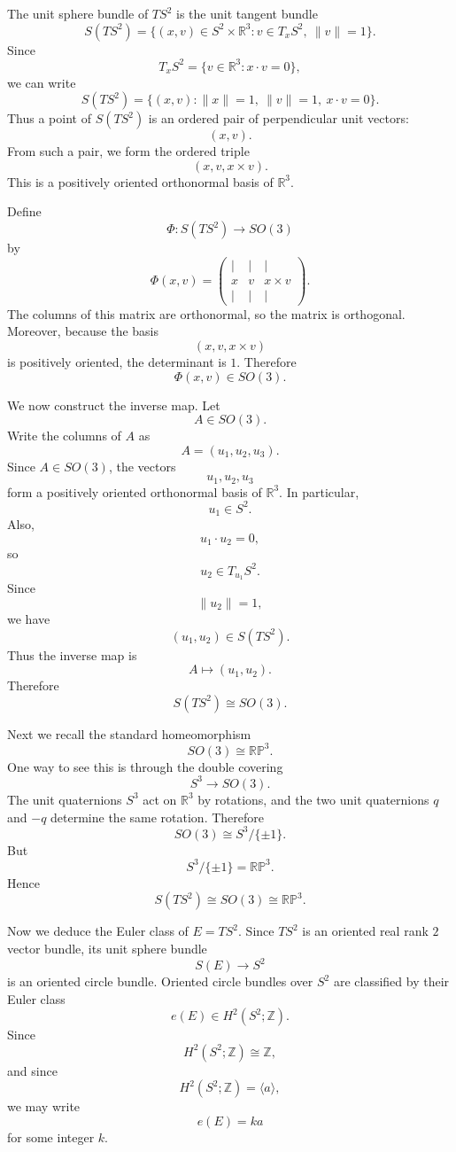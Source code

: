 \begin{solution}
The unit sphere bundle of \(TS^{2}\) is the unit tangent bundle
	\[
	S(TS^{2})
	=
	\{(x,v)\in S^{2}\times \mathbb R^{3}:v\in T_{x}S^{2},\ \|v\|=1\}.
	\]
	Since
	\[
	T_{x}S^{2}
	=
	\{v\in \mathbb R^{3}:x\cdot v=0\},
	\]
	we can write
	\[
	S(TS^{2})
	=
	\{(x,v):\|x\|=1,\ \|v\|=1,\ x\cdot v=0\}.
	\]
	Thus a point of \(S(TS^{2})\) is an ordered pair of perpendicular unit vectors:
	\[
	(x,v).
	\]
	From such a pair, we form the ordered triple
	\[
	(x,v,x\times v).
	\]
	This is a positively oriented orthonormal basis of \(\mathbb R^{3}\).

	Define
	\[
	\Phi:S(TS^{2})\to SO(3)
	\]
	by
	\[
	\Phi(x,v)
	=
	\begin{pmatrix}
		|&|&|\\
		x&v&x\times v\\
		|&|&|
	\end{pmatrix}.
	\]
	The columns of this matrix are orthonormal, so the matrix is orthogonal. Moreover, because the basis
	\[
	(x,v,x\times v)
	\]
	is positively oriented, the determinant is \(1\). Therefore
	\[
	\Phi(x,v)\in SO(3).
	\]

	We now construct the inverse map. Let
	\[
	A\in SO(3).
	\]
	Write the columns of \(A\) as
	\[
	A=(u_{1},u_{2},u_{3}).
	\]
	Since \(A\in SO(3)\), the vectors
	\[
	u_{1},u_{2},u_{3}
	\]
	form a positively oriented orthonormal basis of \(\mathbb R^{3}\). In particular,
	\[
	u_{1}\in S^{2}.
	\]
	Also,
	\[
	u_{1}\cdot u_{2}=0,
	\]
	so
	\[
	u_{2}\in T_{u_{1}}S^{2}.
	\]
	Since
	\[
	\|u_{2}\|=1,
	\]
	we have
	\[
	(u_{1},u_{2})\in S(TS^{2}).
	\]
	Thus the inverse map is
	\[
	A\mapsto (u_{1},u_{2}).
	\]
	Therefore
	\[
	\boxed{S(TS^{2})\cong SO(3).}
	\]

	Next we recall the standard homeomorphism
	\[
	SO(3)\cong \mathbb{RP}^{3}.
	\]
	One way to see this is through the double covering
	\[
	S^{3}\to SO(3).
	\]
	The unit quaternions \(S^{3}\) act on \(\mathbb R^{3}\) by rotations, and the two unit quaternions \(q\) and \(-q\) determine the same rotation. Therefore
	\[
	SO(3)\cong S^{3}/\{\pm 1\}.
	\]
	But
	\[
	S^{3}/\{\pm 1\}=\mathbb{RP}^{3}.
	\]
	Hence
	\[
	\boxed{S(TS^{2})\cong SO(3)\cong \mathbb{RP}^{3}.}
	\]

	Now we deduce the Euler class of \(E=TS^{2}\). Since \(TS^{2}\) is an oriented real rank \(2\) vector bundle, its unit sphere bundle
	\[
	S(E)\to S^{2}
	\]
	is an oriented circle bundle. Oriented circle bundles over \(S^{2}\) are classified by their Euler class
	\[
	e(E)\in H^{2}(S^{2};\mathbb Z).
	\]
	Since
	\[
	H^{2}(S^{2};\mathbb Z)\cong \mathbb Z,
	\]
	and since
	\[
	H^{2}(S^{2};\mathbb Z)=\langle a\rangle,
	\]
	we may write
	\[
	e(E)=ka
	\]
	for some integer \(k\).


\end{solution}
